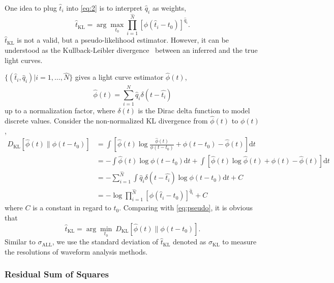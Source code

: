 One idea to plug $\hat{t}_i$ into \eqref{eq:2} is to interpret $\hat{q}_i$ as weights,
\begin{equation}
  \label{eq:pseudo}
  \hat{t}_\mathrm{KL} = \arg\underset{t_0}{\max} \prod_{i=1}^{\hat{N}} \left[\phi(\hat{t}_i-t_0)\right]^{\hat{q}_i}.
\end{equation}
$\hat{t}_\mathrm{KL}$ is not a valid, but a pseudo-likelihood estimator. However, it can be understood as the Kullback-Leibler divergence~\cite{kullback_information_1951} between an inferred and the true light curves.

$\{(\hat{t}_i, \hat{q}_i)|i=1,\ldots,\hat{N}\}$ gives a light curve estimator $\hat{\phi}(t)$,
\begin{equation}
  \label{eq:lc}
  \hat{\phi}(t) = \sum_{i=1}^{\hat{N}} \hat{q}_i\delta(t-\hat{t_i})
\end{equation}
up to a normalization factor, where $\delta(t)$ is the Dirac delta function to model discrete values.  Consider the non-normalized KL divergence from $\hat{\phi}(t)$ to $\phi(t)$,
\begin{equation}
  \begin{aligned}
    D_\mathrm{KL}\left[\hat{\phi}(t) \parallel \phi(t-t_0)\right] & =\int \left[\hat{\phi}(t) \log\frac{\hat{\phi}(t)}{\phi(t-t_0)} + \phi(t-t_0) - \hat{\phi}(t) \right]\mathrm{d}t \\
    & = - \int \hat{\phi}(t) \log\phi(t-t_0)\mathrm{d}t + \int \left[\hat{\phi}(t) \log\hat{\phi}(t) + \phi(t) - \hat{\phi}(t) \right]\mathrm{d}t \\
    & = - \sum_{i=1}^{\hat{N}}\int \hat{q}_i\delta(t-\hat{t_i}) \log\phi(t-t_0)\mathrm{d}t + C \\
    & = -\log \prod_{i=1}^{\hat{N}} \left[\phi(\hat{t}_i-t_0)\right]^{\hat{q}_i} + C
  \label{eq:kl}
  \end{aligned}
\end{equation}
where $C$ is a constant in regard to $t_0$.  Comparing with \eqref{eq:pseudo}, it is obvious that
\begin{equation}
  \label{eq:kl2}
  \hat{t}_\mathrm{KL} = \arg\underset{t_0}{\min}~D_\mathrm{KL}\left[\hat{\phi}(t) \parallel \phi(t-t_0)\right].
\end{equation}
Similar to $\sigma_\mathrm{ALL}$, we use the standard deviation of $\hat{t}_\mathrm{KL}$ denoted as $\sigma_\mathrm{KL}$ to measure the resolutions of waveform analysis methods.

\subsubsection{Residual Sum of Squares}
\label{sec:rss}

